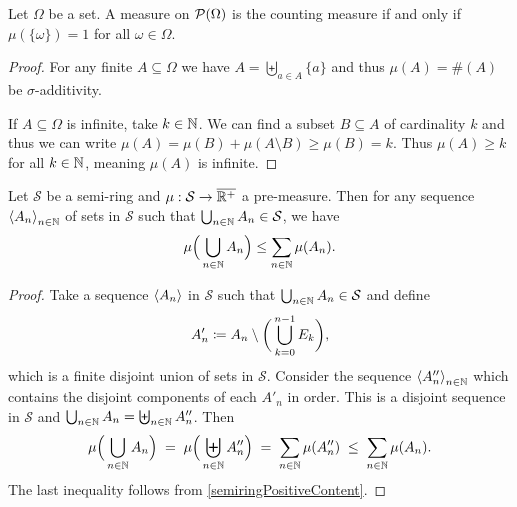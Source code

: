 \begin{lemma} \label{countingMeasureCriterion}
Let $\Omega$ be a set. A measure on $\operatorname{\mathcal{P}}(\Omega)$ is the counting measure \textup{if and only if} $\mu(\{\omega\}) = 1$ for all $\omega\in\Omega$.
\end{lemma}
\begin{proof}
For any finite $A\subseteq \Omega$ we have $A = \biguplus_{a\in A}\{a\}$ and thus $\mu(A) = \#(A)$ be $\sigma$-additivity.

If $A\subseteq \Omega$ is infinite, take $k\in \mathbb{N}$. We can find a subset $B\subseteq A$ of cardinality $k$ and thus we can write $\mu(A) = \mu(B) + \mu(A\setminus B) \geq \mu(B) = k$. Thus $\mu(A) \geq k$ for all $k\in \mathbb{N}$, meaning $\mu(A)$ is infinite.
\end{proof}

\begin{proposition} \label{premeasureSubadditive}
Let $\mathcal{S}$ be a semi-ring and $\mu: \mathcal{S} \to \overline{\mathbb{R}^+}$ a pre-measure. Then for any sequence $\left\langle A_n \right\rangle_{n\in \mathbb{N}}$ of sets in $\mathcal{S}$ such that $\bigcup_{n\in\mathbb{N}}A_n \in \mathcal{S}$, we have
\[ \mu\Big(\bigcup_{n\in\mathbb{N}}A_n\Big) \leq \sum_{n\in\mathbb{N}}\mu(A_n). \]
\end{proposition}
\begin{proof}
Take a sequence $\left\langle A_n \right\rangle$ in $\mathcal{S}$ such that $\bigcup_{n\in\mathbb{N}}A_n\in\mathcal{S}$ and define
\[ A_n' \coloneqq A_n \setminus\bigg(\bigcup_{k=0}^{n-1}E_k\bigg), \]
which is a finite disjoint union of sets in $\mathcal{S}$. Consider the sequence $\left\langle A^{\prime\prime}_n \right\rangle_{n\in\mathbb{N}}$ which contains the disjoint components of each $A'_n$ in order. This is a disjoint sequence in $\mathcal{S}$ and $\bigcup_{n\in \mathbb{N}}A_n = \biguplus_{n\in \mathbb{N}}A_n^{\prime\prime}$.
Then
\[ \mu\Big(\bigcup_{n\in\mathbb{N}}A_n\Big) \;=\; \mu\Big(\biguplus_{n\in\mathbb{N}}A_n^{\prime\prime}\Big) \;=\; \sum_{n\in\mathbb{N}}\mu(A_n^{\prime\prime}) \;\leq\; \sum_{n\in\mathbb{N}}\mu(A_n). \]
The last inequality follows from \ref{semiringPositiveContent}.
\end{proof}

